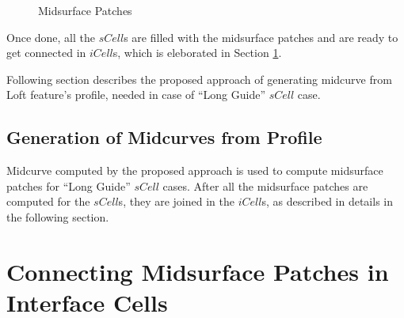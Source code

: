 	\begin{figure}[!h]
	\centering     %
	 \quad
	\caption{Midsurface Patches } %
	\label{fig:midsurfcelljoin:scells}
	\end{figure}

Once done, all the $sCell$s are filled with the midsurface patches and are ready to get connected in $iCell$s, which is eleborated in Section \ref{sec:midsurfcelljoin:icell}.

Following section describes the proposed approach of generating midcurve from Loft feature's profile, needed in case of ``Long Guide'' $sCell$ case.

\subsection{Generation of Midcurves from Profile} \label{sec:midcurve}


%
	
Midcurve computed by the proposed approach is used to compute midsurface patches for ``Long Guide'' $sCell$ cases. After all the midsurface patches are computed for the $sCell$s, they are joined in the $iCell$s, as described in details in the following section.

\section{Connecting Midsurface Patches in Interface Cells}
\label{sec:midsurfcelljoin:icell}

